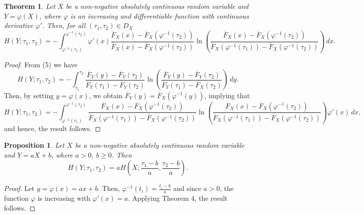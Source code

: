 \documentclass[11pt]{article}
\newtheorem{theorem}{Theorem}
\newtheorem{proposition}{Proposition}
\begin{document}
\begin{theorem}
	Let $X$ be a non-negative absolutely continuous random variable and $Y=\varphi(X)$, where $\varphi$ is an increasing and differentiable function with continuous derivative $\varphi'$. Then, for all $(\tau_1,\tau_2)\in D_X$
	\begin{equation*}
		\textstyle H(Y;\tau_1,\tau_2) = -\int_{\varphi^{-1}(\tau_1)}^{\varphi^{-1}(\tau_2)} \varphi'(x)\frac{\overline{F}_X(x)-\overline{F}_X(\varphi^{-1}(\tau_2))}{\overline{F}_X(x)-\overline{F}_X(\varphi^{-1}(\tau_2))} \ln\left(\frac{\overline{F}_X(x)-\overline{F}_X(\varphi^{-1}(\tau_2))}{\overline{F}_X(\varphi^{-1}(\tau_1))-\overline{F}_X(\varphi^{-1}(\tau_2))}\right)\,dx.
	\end{equation*}
\end{theorem}

\begin{proof}
	From (5) we have
	\begin{equation*}
		\textstyle H(Y;\tau_1,\tau_2) = -\int_{\tau_1}^{\tau_2} \frac{\overline{F}_Y(y)-\overline{F}_Y(\tau_2)}{\overline{F}_Y(\tau_1)-\overline{F}_Y(\tau_2)} \ln\left(\frac{\overline{F}_Y(y)-\overline{F}_Y(\tau_2)}{\overline{F}_Y(\tau_1)-\overline{F}_X(\tau_2)}\right)\,dy.
	\end{equation*}
	Then, by setting $y=\varphi(x)$, we obtain $\overline{F}_Y(y)=\overline{F}_X(\varphi^{-1}(y))$, implying that
	{\small 
		\begin{equation*}
			\textstyle H(Y;\tau_1,\tau_2) = -\int_{\varphi^{-1}(\tau_1)}^{\varphi^{-1}(\tau_2)} \frac{\overline{F}_X(x)-\overline{F}_X(\varphi^{-1}(\tau_2))}{\overline{F}_X(\varphi^{-1}(\tau_1))-\overline{F}_X(\varphi^{-1}(\tau_2))} \ln\left(\frac{\overline{F}_X(x)-\overline{F}_X(\varphi^{-1}(\tau_2))}{\overline{F}_X(\varphi^{-1}(\tau_1))-\overline{F}_X(\varphi^{-1}(\tau_2))}\right) \varphi'(x)\,dx,
	\end{equation*} } and hence, the result follows.
\end{proof}

 
\begin{proposition}
	Let $X$ be a non-negative absolutely continuous random variable and $Y=aX+b$, where $a>0$, $b\geq 0$. Then
	$$ \textstyle H(Y;\tau_1,\tau_2) = a H(X;\frac{\tau_1-b}{a},\frac{\tau_2-b}{a}). $$
\end{proposition}

\begin{proof}
	Let $y=\varphi(x)=ax+b$. Then, $\varphi^{-1}(t_i)=\frac{t_i - b}{a}$ and since $a>0$, the function $\varphi$ is increasing with $\varphi'(x)=a$. Applying Theorem 4, the result follows.
\end{proof}
\end{document}
